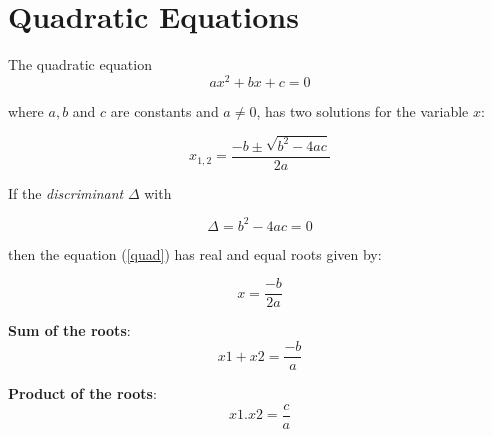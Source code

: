 \section{Quadratic Equations}

The quadratic equation 
\begin{equation}
\label{quad}
ax^2+bx+c = 0
\end{equation}

where \(a,b\) and \(c\) are constants and \(a \neq 0\), has two solutions for the variable \(x\):

\begin{equation}
\label{root}
x_{1,2} = \frac{-b \pm \sqrt{b^2 - 4ac}}{2a}
\end{equation}

If the \emph{discriminant} \( \Delta \) with 

\begin{equation}
\label{delta}
\Delta = b^2 - 4ac = 0
\end{equation}

then the equation (\ref{quad}) has real and equal roots given by:

\begin{equation}
\label{equal_root}
x = \frac{-b}{2a}
\end{equation}

\textbf{Sum of the roots}:
\begin{equation}
\label{sum_root}
x1 + x2 = \frac{-b}{a}
\end{equation}

\textbf{Product of the roots}:
\begin{equation}
\label{product_root}
x1.x2 = \frac{c}{a}
\end{equation}